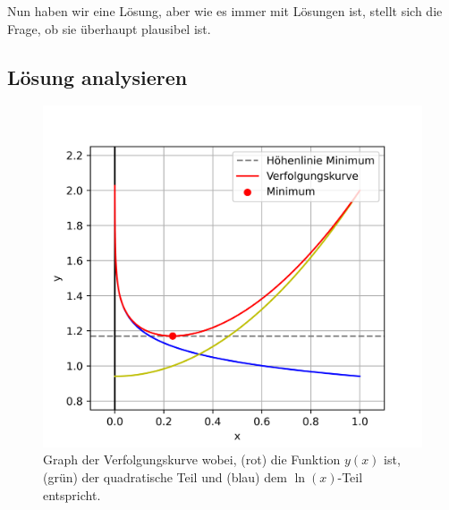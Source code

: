 Nun haben wir eine Lösung, aber wie es immer mit Lösungen ist, stellt sich die Frage, ob sie überhaupt plausibel ist.

\subsection{Lösung analysieren
	\label{lambertw:subsection:LoesAnalys}}

\begin{figure}
	\centering
	\includegraphics{papers/lambertw/Bilder/VerfolgungskurveBsp.png}
	\caption[Graph der Verfolgungskurve]{Graph der Verfolgungskurve wobei, ({\color{red}rot}) die Funktion \ensuremath{y(x)} ist, ({\color{darkgreen}grün}) der quadratische Teil und ({\color{blue}blau}) dem \ensuremath{\operatorname{ln}(x)}-Teil entspricht.
	\label{lambertw:BildFunkLoes}
	}
\end{figure}


